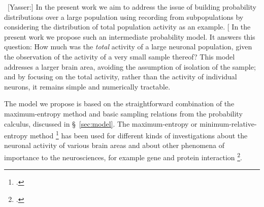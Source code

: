 \documentclass[\ifafour a4paper,12pt,\else a5paper,10pt,\fi%
onecolumn,oneside,article,%
british%
]{memoir}
\theoremstyle{remark}
\theoremstyle{innote}
\newcommand*{\citep}{\footcites}
\renewcommand*{\|}{\nonscript\,\vert\nonscript\;\mathopen{}}
\newcommand*{\sect}{\S}%
\newcommand*{\puzzle}{{\fontencoding{U}\fontfamily{fontawesometwo}\selectfont\symbol{225}}}
\newcommand{\mynote}[1]{ {\color{notecolour}\puzzle\ #1}}
\begin{document}
\mynote{[Yasser:] In the present work we aim to address the issue of
  building probability distributions over a large population using
  recording from subpopulations by considering the distribution of total
  population activity as an example. [} In the present work we propose such
an intermediate probability model. It answers this question: How much was
the \emph{total} activity of a large neuronal population, given the
observation of the activity of a very small sample thereof? This model
addresses a larger brain area, avoiding the assumption of isolation of the
sample; and by focusing on the total activity, rather than the activity of
individual neurons, it remains simple and numerically tractable.


The model we propose is based on the straightforward combination of the
maximum-entropy method and basic sampling relations from the probability
calculus, discussed in \sect~\ref{sec:model}. The maximum-entropy or
minimum-relative-entropy method \citep{jaynes1957}[much clearer
in][]{jaynes1963}{sivia1996_r2006,hobsonetal1973,jaynes1985b_r1996,grandy1980}
has been used for different kinds of investigations about the neuronal
activity of various brain areas and about other phenomena of importance to
the neurosciences, for example gene and protein interaction \citep[for
example][]{martignonetal1995,bohteetal2000,shlensetal2006,schneidmanetal2006,tkaciketal2006,mackeetal2009b,tkaciketal2009,roudietal2009c,barreiroetal2010,gerwinnetal2010,mackeetal2011b,ganmoretal2011,cohenetal2011,granotatedgietal2013,mackeetal2013,tkaciketal2014b,shimazakietal2015,moraetal2015,lezonetal2006,weigtetal2009}.
\end{document}
